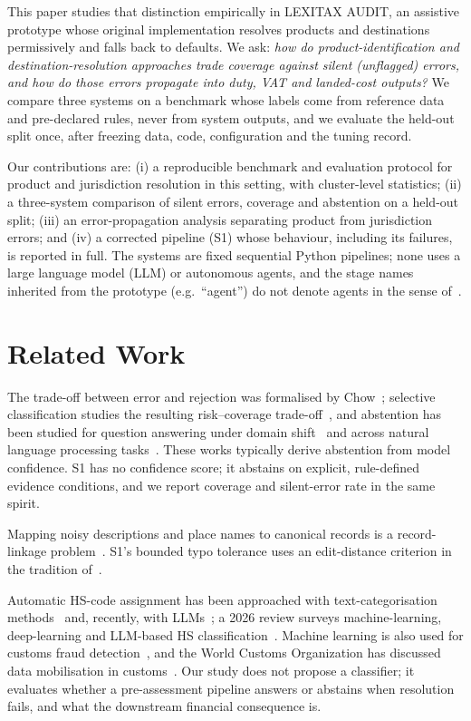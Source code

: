 \documentclass[conference]{IEEEtran}
\begin{document}
This paper studies that distinction empirically in LEXITAX AUDIT, an assistive prototype whose original implementation
resolves products and destinations permissively and falls back to defaults. We ask: \emph{how do product-identification
and destination-resolution approaches trade coverage against silent (unflagged) errors, and how do those errors
propagate into duty, VAT and landed-cost outputs?} We compare three systems on a benchmark whose labels come from
reference data and pre-declared rules, never from system outputs, and we evaluate the held-out split once, after freezing
data, code, configuration and the tuning record.

Our contributions are: (i) a reproducible benchmark and evaluation protocol for product and jurisdiction resolution in
this setting, with cluster-level statistics; (ii) a three-system comparison of silent errors, coverage and abstention on
a held-out split; (iii) an error-propagation analysis separating product from jurisdiction errors; and (iv) a corrected
pipeline (S1) whose behaviour, including its failures, is reported in full. The systems are fixed sequential Python
pipelines; none uses a large language model (LLM) or autonomous agents, and the stage names inherited from the prototype
(e.g.\ ``agent'') do not denote agents in the sense of~\cite{wooldridge1995}.

\section{Related Work}
The trade-off between error and rejection was formalised by
Chow~\cite{chow1970}; selective classification studies the resulting risk--coverage trade-off~\cite{elyaniv2010,
geifman2017}, and abstention has been studied for question answering under domain shift~\cite{kamath2020} and across
natural language processing tasks~\cite{xin2021}. These works typically derive abstention from model confidence. S1 has
no confidence score; it abstains on explicit, rule-defined evidence conditions, and we report coverage and silent-error
rate in the same spirit.

Mapping noisy descriptions and place names to canonical records is
a record-linkage problem~\cite{fellegi1969, elmagarmid2007, christen2012}. S1's bounded typo tolerance uses an
edit-distance criterion in the tradition of~\cite{damerau1964, navarro2001}.

Automatic HS-code assignment has been approached with
text-categorisation methods~\cite{ding2015} and, recently, with LLMs~\cite{koch2025}; a 2026 review surveys machine-learning,
deep-learning and LLM-based HS classification~\cite{wube2026}. Machine learning is also used for customs fraud
detection~\cite{kim2020date}, and the World Customs Organization has discussed data mobilisation in
customs~\cite{mikuriya2020}. Our study does not propose a classifier; it evaluates whether a pre-assessment pipeline
answers or abstains when resolution fails, and what the downstream financial consequence is.
\end{document}
